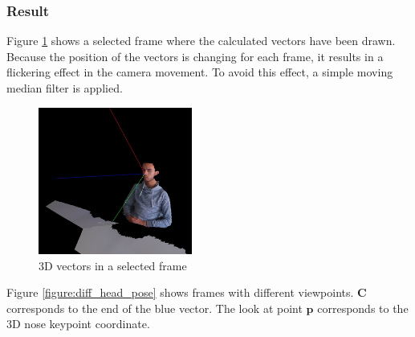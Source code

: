 \subsubsection{Result}

Figure \ref{figure:00265_head_vector} shows a selected frame where the calculated vectors have been drawn. Because the position of the vectors is changing for each frame, it results in a flickering effect in the camera movement. To avoid this effect, a simple moving median filter is applied.

\begin{figure}[H]
    \centering
    \includegraphics[width=0.45\textwidth]{images/scenario/00265_head_vector.jpg}
    \caption{3D vectors in a selected frame}
    \label{figure:00265_head_vector}
\end{figure}

Figure \ref{figure:diff_head_pose} shows frames with different viewpoints. $\mathbf{C}$ corresponds to the end of the blue vector. The look at point $\mathbf{p}$ corresponds to the 3D nose keypoint coordinate.

